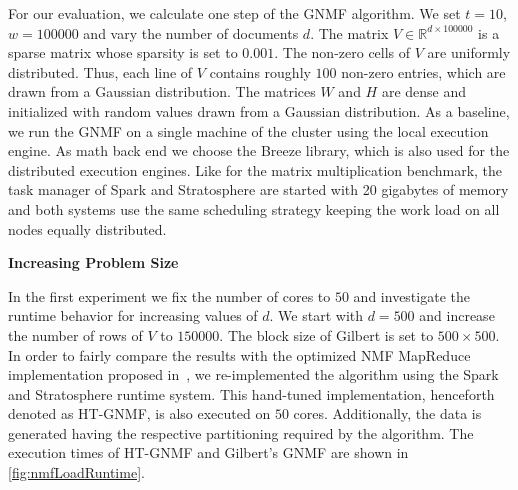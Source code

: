 For our evaluation, we calculate one step of the GNMF algorithm.
We set $t=10$, $w=100000$ and vary the number of documents $d$.
The matrix $V\in\mathbb{R}^{d\times 100000}$ is a sparse matrix whose sparsity is set to $0.001$.
The non-zero cells of $V$ are uniformly distributed.
Thus, each line of $V$ contains roughly $100$ non-zero entries, which are drawn from a Gaussian distribution.
The matrices $W$ and $H$ are dense and initialized with random values drawn from a Gaussian distribution.
As a baseline, we run the GNMF on a single machine of the cluster using the local execution engine.
As math back end we choose the Breeze library, which is also used for the distributed execution engines.
Like for the matrix multiplication benchmark, the task manager of Spark and Stratosphere are started with 20 gigabytes of memory and both systems use the same scheduling strategy keeping the work load on all nodes equally distributed.

\textbf{Increasing Problem Size}

In the first experiment we fix the number of cores to $50$ and investigate the runtime behavior for increasing values of $d$.
We start with $d=500$ and increase the number of rows of $V$ to $150000$.
The block size of Gilbert is set to $500 \times 500$.
In order to fairly compare the results with the optimized NMF MapReduce implementation proposed in~\cite{liu:2010a}, we re-implemented the algorithm using the Spark and Stratosphere runtime system.
This hand-tuned implementation, henceforth denoted as HT-GNMF, is also executed on $50$ cores.
Additionally, the data is generated having the respective partitioning required by the algorithm.
The execution times of HT-GNMF and Gilbert's GNMF are shown in \cref{fig:nmfLoadRuntime}.

